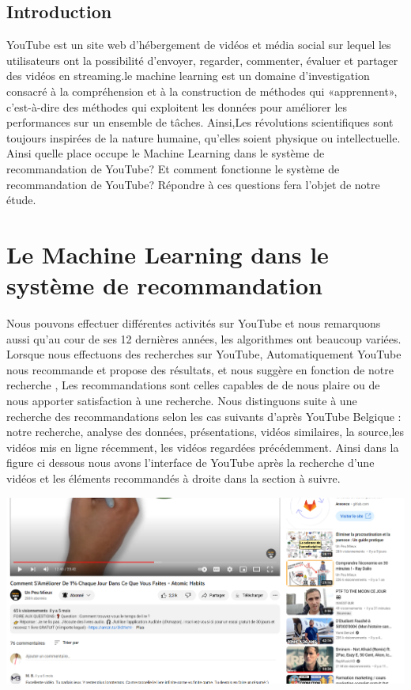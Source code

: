 \documentclass[12pt,a4paper]{article}
\begin{document}
\begin{center}

\section*{Introduction}
\end{center}
  YouTube  est un site web d'hébergement de vidéos et média social sur lequel les utilisateurs ont la possibilité d'envoyer, regarder, commenter, évaluer et partager des vidéos en streaming.le machine learning est un domaine d'investigation consacré à la compréhension et 
à la construction de méthodes qui «apprennent», c'est-à-dire des méthodes qui exploitent les données pour améliorer les performances sur un ensemble de tâches. Ainsi,Les 
révolutions scientifiques sont toujours inspirées de la nature humaine, qu'elles soient physique ou intellectuelle. Ainsi quelle place occupe le Machine Learning dans le système de recommandation de YouTube? Et comment fonctionne le système de recommandation
de YouTube? Répondre à ces questions fera l'objet de notre étude. 
\newpage
\section{Le Machine Learning dans le système de recommandation}
 Nous pouvons effectuer différentes activités sur YouTube et nous remarquons aussi qu'au cour de ses 12 dernières années, les algorithmes ont beaucoup variées\cite{mckelvey2022portee}. Lorsque nous effectuons des recherches sur YouTube, Automatiquement YouTube nous recommande et propose des résultats,  et nous  suggère en fonction de notre recherche , Les recommandations sont celles capables de de nous plaire ou de nous apporter satisfaction à une recherche. Nous distinguons suite à une recherche des recommandations selon les cas suivants d'après YouTube Belgique : notre recherche, analyse des données, présentations, vidéos similaires, la source,les vidéos mis en ligne récemment, les vidéos regardées précédemment. Ainsi dans la figure ci dessous nous avons l'interface de YouTube après la recherche d'une vidéos et les éléments recommandés à droite dans la section à suivre.
 
\includegraphics[width=1.1\linewidth]{Capture 9}
\end{document}
